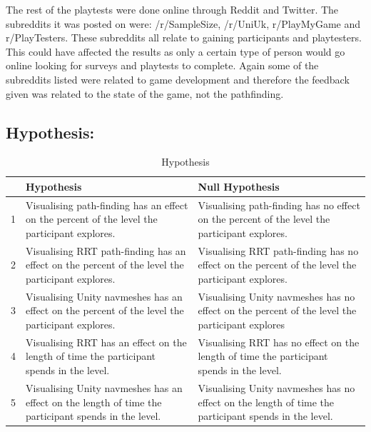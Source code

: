 \documentclass[journal]{IEEEtran}
\begin{document}
	The rest of the playtests were done online through Reddit and Twitter. The subreddits it was posted on were: /r/SampleSize, /r/UniUk, r/PlayMyGame and r/PlayTesters. These subreddits all relate to gaining participants and playtesters.  This could have affected the results as only a certain type of person would go online looking for surveys and playtests to complete. Again some of the subreddits listed were related to game development and therefore the feedback given was related to the state of the game, not the pathfinding.     
	
	
	\subsection{Hypothesis:} \label{hypothesis}
	\begin{table}[h]
		\centering
		\caption{Hypothesis}
		\label{table:Hypothesis}
		\def\arraystretch{1.5}
		\begin{tabular}{|c|p{7.5cm}|p{7.5cm}|}
			\hline
			& \textbf{Hypothesis}& \textbf{Null Hypothesis} \\
			\hline
			1 & Visualising path-finding has an effect on the percent of the level the participant explores.
			& Visualising path-finding has no effect on the percent of the level the participant explores.
			\\ \hline
			
			2 & Visualising RRT path-finding has an effect on the percent of the level the participant explores.
			& Visualising RRT path-finding has no effect on the percent of the level the participant explores.
			\\ \hline
			
			3 & Visualising Unity navmeshes has an effect on the percent of the level the participant explores.
			& Visualising Unity navmeshes has no effect on the percent of the level the participant explores
			\\ \hline
			
			4 & Visualising RRT has an effect on the length of time the participant spends in the level. 
			& Visualising RRT has no effect on the length of time the participant spends in the level. 
			\\ \hline
			
			5 & Visualising Unity navmeshes has an effect on the length of time the participant spends in the level. 
			& Visualising Unity navmeshes has no effect on the length of time the participant spends in the level.
			\\ \hline
			

\end{tabular}
\end{table}
\end{document}
